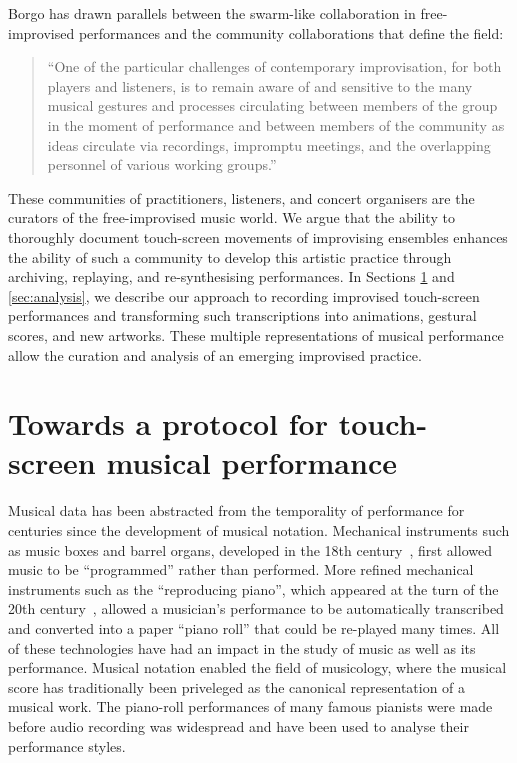 \documentclass[graybox]{svmult}
\begin{document}
Borgo has drawn parallels between the swarm-like collaboration in
free-improvised performances and the community collaborations that
define the field: 
\begin{quote}
``One of the particular challenges of contemporary
improvisation, for both players and listeners, is to remain aware of
and sensitive to the many musical gestures and processes circulating
between members of the group in the moment of performance and between
members of the community as ideas circulate via recordings, impromptu
meetings, and the overlapping personnel of various working
groups.''~\cite{Borgo:2006fv} 
\end{quote}
These communities of practitioners, listeners, and concert organisers
are the curators of the free-improvised music world. We argue that the
ability to thoroughly document touch-screen movements of improvising
ensembles enhances the ability of such a community to develop this
artistic practice through archiving, replaying, and re-synthesising
performances. In Sections \ref{sec:protocols} and \ref{sec:analysis},
we describe our approach to recording improvised touch-screen
performances and transforming such transcriptions into animations,
gestural scores, and new artworks. These multiple representations of
musical performance allow the curation and analysis of an emerging
improvised practice.

\section{Towards a protocol for touch-screen musical performance}
\label{sec:protocols}


Musical data has been abstracted from the temporality of performance
for centuries since the development of musical notation. Mechanical
instruments such as music boxes and barrel organs, developed in the
18th century~\cite{Fowler:1967kq}, first allowed music to be
``programmed'' rather than performed. More refined mechanical
instruments such as the ``reproducing piano'', which appeared at the
turn of the 20th century~\cite{Kapur:2005fk}, allowed a musician's
performance to be automatically transcribed and converted into a paper
``piano roll'' that could be re-played many times. All of these
technologies have had an impact in the study of music as well as its
performance. Musical notation enabled the field of musicology, where
the musical score has traditionally been priveleged as the canonical
representation of a musical work. The piano-roll performances of many
famous pianists were made before audio recording was widespread and
have been used to analyse their performance styles.
\end{document}

